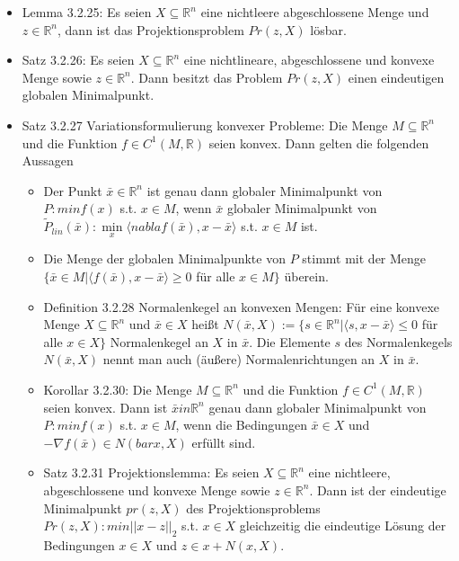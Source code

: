 \documentclass[paper=a4, fontsize=11pt]{scrartcl} %
\numberwithin{equation}{section} %
\numberwithin{figure}{section} %
\numberwithin{table}{section} %
\begin{document}
\begin{itemize}
  \item Lemma 3.2.25: Es seien $X \subseteq \mathbb{R}^n$ eine nichtleere abgeschlossene Menge und $z \in \mathbb{R}^n$, dann ist das Projektionsproblem $Pr(z,X)$ lösbar.
  \item Satz 3.2.26: Es seien $X \subseteq \mathbb{R}^n$ eine nichtlineare, abgeschlossene und konvexe Menge sowie $z \in \mathbb{R}^n$. Dann besitzt das Problem $Pr(z,X)$ einen eindeutigen globalen Minimalpunkt.
  \item Satz 3.2.27 Variationsformulierung konvexer Probleme: Die Menge $M \subseteq \mathbb{R}^n$ und die Funktion $f \in C^1(M,\mathbb{R})$ seien konvex. Dann gelten die folgenden Aussagen
  \begin{itemize}
    \item Der Punkt $\bar{x} \in \mathbb{R}^n$ ist genau dann globaler Minimalpunkt von $P: min f(x)$ s.t. $x \in M$, wenn $\bar{x}$ globaler Minimalpunkt von $\tilde{P}_{lin}(\bar{x}): \min\limits_x \langle nabla f(\bar{x}),x-\bar{x} \rangle$ s.t. $x \in M$ ist.
    \item Die Menge der globalen Minimalpunkte von $P$ stimmt mit der Menge $\{ \bar{x} \in M | \langle f(\bar{x}),x-\bar{x} \rangle \ge 0$ für alle $x \in M\}$ überein.
    \item Definition 3.2.28 Normalenkegel an konvexen Mengen: Für eine konvexe Menge $X \subseteq \mathbb{R}^n$ und $\bar{x} \in X$ heißt $N(\bar{x},X) := \{s \in \mathbb{R}^n | \langle s,x-\bar{x} \rangle \le 0$ für alle $x \in X\}$ Normalenkegel an $X$ in $\bar{x}$. Die Elemente $s$ des Normalenkegels $N(\bar{x},X)$ nennt man auch (äußere) Normalenrichtungen an $X$ in $\bar{x}$.
    \item Korollar 3.2.30: Die Menge $M \subseteq \mathbb{R}^n$ und die Funktion $f \in C^1(M,\mathbb{R})$ seien konvex. Dann ist $\bar{x} in \mathbb{R}^n$ genau dann globaler Minimalpunkt von $P: min f(x)$ s.t. $x \in M$, wenn die Bedingungen $\bar{x} \in X$ und $- \nabla f(\bar{x}) \in N(bar{x},X)$ erfüllt sind.
    \item Satz 3.2.31 Projektionslemma: Es seien $X  \subseteq \mathbb{R}^n$ eine nichtleere, abgeschlossene und konvexe Menge sowie $z \in \mathbb{R}^n$. Dann ist der eindeutige Minimalpunkt $pr(z,X)$ des Projektionsproblems $Pr(z,X): min ||x-z||_2$ s.t. $x \in X$ gleichzeitig die eindeutige Lösung der Bedingungen $x \in X$ und $z \in x + N(x,X)$.
  \end{itemize}
\end{itemize}
\end{document}
